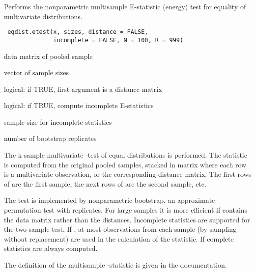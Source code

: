 \begin{Description}\relax
Performs the nonparametric multisample E-statistic (energy) test
for equality of multivariate distributions.
\end{Description}
\begin{Usage}
\begin{verbatim}
 eqdist.etest(x, sizes, distance = FALSE, 
              incomplete = FALSE, N = 100, R = 999)
\end{verbatim}
\end{Usage}
\begin{Arguments}
\begin{ldescription}
\item[\code{x}] data matrix of pooled sample
\item[\code{sizes}] vector of sample sizes
\item[\code{distance}] logical: if TRUE, first argument is a distance matrix
\item[\code{incomplete}] logical: if TRUE, compute incomplete E-statistics
\item[\code{N}] sample size for incomplete statistics
\item[\code{R}] number of bootstrap replicates 
\end{ldescription}
\end{Arguments}
\begin{Details}\relax
The k-sample multivariate -test of equal distributions
is performed. The statistic is computed from the original
pooled samples, stacked in matrix  where each row
is a multivariate observation, or the corresponding distance matrix. The
first  rows of  are the first sample, the next
 rows of  are the second sample, etc.

The test is implemented by nonparametric bootstrap, an approximate 
permutation test with  replicates. For large samples it is
more efficient if  contains the data matrix rather than the
distances. Incomplete statistics are supported for the two-sample test. If
, at most  observations from each sample 
(by sampling without replacement) are used in the calculation of the statistic.
If  complete statistics are always computed.

The definition of the multisample -statistic is given in the 
 documentation.\end{Details}

